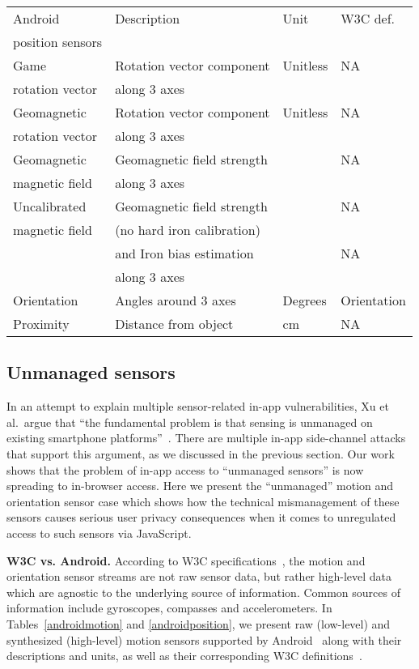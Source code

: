 \documentclass[10pt,twocolumn]{article}
\begin{document}
\begin{table*}[t]
\centering
\begin{tabular}{|l|l|l|l|}
\hline
Android & Description &  Unit & W3C def.\\
position sensors &&&\\
\hline
Game  & Rotation vector component & Unitless & NA\\
rotation vector & along 3 axes&&\\
\hline
Geomagnetic  & Rotation vector component& Unitless & NA\\
rotation vector&  along 3 axes&&\\
\hline
Geomagnetic  & Geomagnetic field strength &  & NA\\
magnetic field& along 3 axes&&\\
\hline
Uncalibrated & Geomagnetic field strength &  & NA\\
magnetic field & (no hard iron calibration)&&\\
\hline
& and Iron bias estimation &  & NA\\
&along 3 axes&&\\
\hline
Orientation & Angles around 3 axes& Degrees & Orientation\\
\hline
Proximity & Distance from object & cm & NA\\
\hline
\end{tabular}
\caption{Position sensors supported by Android and their corresponding W3C definitions. Note: Orientation sensor was deprecated in Android~2.2 (API Level~8).}
\label{androidposition}
\end{table*}
\subsection{Unmanaged sensors}
In an attempt to explain multiple sensor-related in-app vulnerabilities, Xu et al.\ argue that ``the fundamental problem is that sensing is unmanaged on existing smartphone platforms''~\cite{taplogger}. 
There are multiple in-app side-channel attacks that support this argument, as we discussed in the previous section. 
Our work shows that the problem of in-app access to ``unmanaged sensors'' is now spreading to in-browser access. 
Here we present the ``unmanaged'' motion and orientation sensor case which shows how the technical mismanagement of these sensors causes serious user privacy consequences when it comes to unregulated access to such sensors via JavaScript. 

\textbf{W3C vs. Android.} 
According to W3C specifications~\cite{W3CMotion}, the motion and orientation sensor streams are not raw sensor data, but rather high-level data which are agnostic to the underlying source of information. Common sources of information include gyroscopes, compasses and accelerometers. In Tables~\ref{androidmotion} and \ref{androidposition}, we present 
raw (low-level) and synthesized (high-level) 
motion sensors supported by Android~\cite{AndDev} along with their descriptions and units, as well as their corresponding W3C definitions~\cite{W3CMotion}. 
\end{document}
